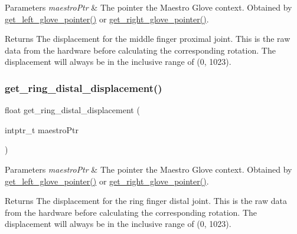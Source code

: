 \begin{DoxyParams}{Parameters}
{\em maestro\+Ptr} & The pointer the Maestro Glove context. Obtained by \hyperlink{group__glove_management_ga63ce3c99d4a8b8db851b22af9185764e}{get\+\_\+left\+\_\+glove\+\_\+pointer()} or \hyperlink{group__glove_management_ga9b8fd9d91aeac3f8da50f7a7eba0c32b}{get\+\_\+right\+\_\+glove\+\_\+pointer()}. \\
\hline
\end{DoxyParams}
\begin{DoxyReturn}{Returns}
The displacement for the middle finger proximal joint. This is the raw data from the hardware before calculating the corresponding rotation. The displacement will always be in the inclusive range of (0, 1023). 
\end{DoxyReturn}
\mbox{\label{group__displacement_access_gab0ff4384ff3e86eec80add30c96939e3}} 
\subsubsection{\texorpdfstring{get\+\_\+ring\+\_\+distal\+\_\+displacement()}{get\_ring\_distal\_displacement()}}
{\footnotesize\ttfamily float get\+\_\+ring\+\_\+distal\+\_\+displacement (\begin{DoxyParamCaption}\item[{intptr\+\_\+t}]{maestro\+Ptr }\end{DoxyParamCaption})}


\begin{DoxyParams}{Parameters}
{\em maestro\+Ptr} & The pointer the Maestro Glove context. Obtained by \hyperlink{group__glove_management_ga63ce3c99d4a8b8db851b22af9185764e}{get\+\_\+left\+\_\+glove\+\_\+pointer()} or \hyperlink{group__glove_management_ga9b8fd9d91aeac3f8da50f7a7eba0c32b}{get\+\_\+right\+\_\+glove\+\_\+pointer()}. \\
\hline
\end{DoxyParams}
\begin{DoxyReturn}{Returns}
The displacement for the ring finger distal joint. This is the raw data from the hardware before calculating the corresponding rotation. The displacement will always be in the inclusive range of (0, 1023). 
\end{DoxyReturn}
\mbox{\label{group__displacement_access_ga61acc449d1bb171722abef39f2c9d8bf}} 

